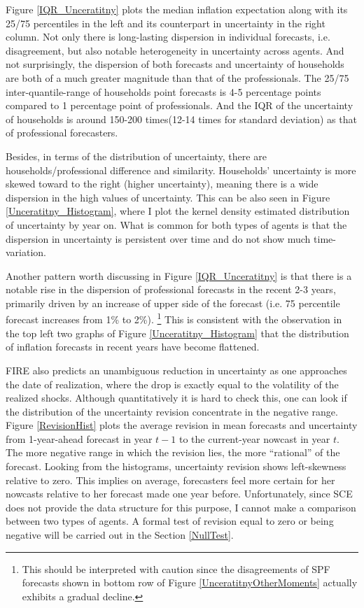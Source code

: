 \documentclass[]{article}
\begin{document}
	Figure \ref{IQR_Unceratitny} plots the median inflation expectation along with its 25/75 percentiles in the left and its counterpart in uncertainty in the right column.  Not only there is long-lasting dispersion in individual forecasts, i.e. disagreement, but also notable heterogeneity in uncertainty across agents.  And not surprisingly, the dispersion of both forecasts and uncertainty of households are both of a much greater magnitude than that of the professionals. The 25/75 inter-quantile-range of households point forecasts is 4-5 percentage points compared to 1 percentage point of professionals. And the IQR of the uncertainty of households is around 150-200 times(12-14 times for standard deviation) as that of professional forecasters.  
	
	Besides, in terms of the distribution of uncertainty, there are households/professional difference and similarity. Households' uncertainty is more skewed toward to the right (higher uncertainty), meaning there is a wide dispersion in the high values of uncertainty. This can be also seen in Figure \ref{Unceratitny_Histogram}, where I plot the kernel density estimated distribution of uncertainty by year on. What is common for both types of agents is that the dispersion in uncertainty is persistent over time and do not show much time-variation.  
	
	Another pattern worth discussing in Figure \ref{IQR_Unceratitny} is that there is a notable rise in the dispersion of professional forecasts in the recent 2-3 years, primarily driven by an increase of upper side of the forecast (i.e. 75 percentile forecast increases from 1\% to 2\%). \footnote{This should be interpreted with caution since the disagreements of SPF forecasts shown in bottom row of Figure \ref{UnceratitnyOtherMoments} actually exhibits a gradual decline. } This is consistent with the observation in the top left two graphs of Figure \ref{Unceratitny_Histogram} that the distribution of inflation forecasts in recent years have become flattened.
	
	FIRE also predicts an unambiguous reduction in uncertainty as one approaches the date of realization, where the drop is exactly equal to the volatility of the realized shocks. Although quantitatively it is hard to check this, one can look if the distribution of the uncertainty revision concentrate in the negative range. Figure \ref{RevisionHist} plots the average revision in mean forecasts and uncertainty from 1-year-ahead forecast in year $t-1$ to the current-year nowcast in year $t$. The more negative range in which the revision lies, the more ``rational'' of the forecast. Looking from the histograms, uncertainty revision shows left-skewness relative to zero. This implies on average,  forecasters feel more certain for her nowcasts relative to her forecast made one year before.  Unfortunately, since SCE does not provide the data structure for this purpose, I cannot make a comparison between two types of agents. A formal test of revision equal to zero or being negative will be carried out in the Section \ref{NullTest}. 
	
\end{document}
